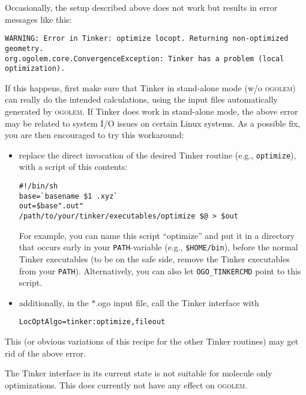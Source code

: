 \documentclass[a4paper,10pt]{scrbook}
\newcommand{\ogo}{\textsc{ogolem}}
\begin{document}
Occasionally, the setup described above does not work but results in
error messages like this:
\begin{verbatim}
WARNING: Error in Tinker: optimize locopt. Returning non-optimized geometry. 
org.ogolem.core.ConvergenceException: Tinker has a problem (local optimization).
\end{verbatim}
If this happens, first make sure that Tinker in stand-alone mode (w/o \ogo{})
can really do the intended calculations, using the input files automatically
generated by \ogo{}. If Tinker does work in stand-alone mode, the above error
may be related to system I/O issues on certain Linux systems. As a
possible fix, you are then encouraged to try this workaround:
\begin{itemize}
\item replace the direct invocation of the desired Tinker routine (e.g.,
  \texttt{optimize}), with a script of this contents:
\begin{verbatim}
#!/bin/sh
base=`basename $1 .xyz`
out=$base".out"
/path/to/your/tinker/executables/optimize $@ > $out
\end{verbatim}
  For example, you can name this script ``optimize'' and put it in a directory
  that occurs early in your \texttt{PATH}-variable (e.g.,
  \texttt{\$HOME/bin}), before the normal Tinker executables (to be on the
  safe side, remove the Tinker executables from your
  \texttt{PATH}). Alternatively, you can also let \texttt{OGO\_TINKERCMD} point
  to this script.
\item additionally, in the $\ast$.ogo input file, call the Tinker interface with
\begin{verbatim}
LocOptAlgo=tinker:optimize,fileout
\end{verbatim}
\end{itemize}
This (or obvious variations of this recipe for the other Tinker routines) may
get rid of the above error.

The Tinker interface in its current state is not suitable for molecule only
optimizations. This does currently not have any effect on \ogo{}.
\end{document}
